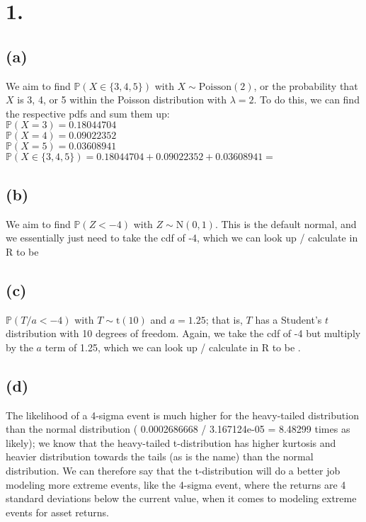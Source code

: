 \documentclass{article}
\begin{document}
\thispagestyle{firstpageheader}

\section*{1.}
{\Large 

\subsection*{(a)}

We aim to find $\mathbb{P}(X \in \{3, 4, 5\})$ with $X \sim \text{Poisson}(2)$, or the probability that $X$ is 3, 4, or 5 within the Poisson distribution with $\lambda = 2$. To do this, we can find the respective pdfs and sum them up: \\
$\mathbb{P}(X = 3) = 0.18044704$ \\
$\mathbb{P}(X = 4) = 0.09022352$ \\
$\mathbb{P}(X = 5) = 0.03608941$ \\ 
$\mathbb{P}(X \in \{3, 4, 5\}) = 0.18044704 + 0.09022352 + 0.03608941 = $ 

\subsection*{(b)}

We aim to find $\mathbb{P}(Z < -4)$ with $Z \sim \text{N}(0, 1)$. This is the default normal, and we essentially just need to take the cdf of -4, which we can look up / calculate in R to be 

\subsection*{(c)}

$\mathbb{P}(T / a < -4)$ with $T \sim \text{t}(10)$ and $a = 1.25$; that is, $T$ has a Student's $t$ distribution with 10 degrees of freedom. Again, we take the cdf of -4 but multiply by the $a$ term of 1.25, which we can look up / calculate in R to be .

\subsection*{(d)}

The likelihood of a 4-sigma event is much higher for the heavy-tailed distribution than the normal distribution ( 0.0002686668 / 3.167124e-05 = 8.48299 times as likely); we know that the heavy-tailed t-distribution has higher kurtosis and heavier distribution towards the tails (as is the name) than the normal distribution. We can therefore say that the t-distribution will do a better job modeling more extreme events, like the 4-sigma event, where the returns are 4 standard deviations below the current value, when it comes to modeling extreme events for asset returns. 

}
\end{document}

